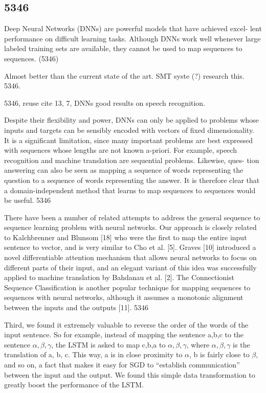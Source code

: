 \subsection{5346}
Deep Neural Networks (DNNs) are powerful models that have achieved excel- lent performance on difficult learning tasks. Although DNNs work well whenever large labeled training sets are available, they cannot be used to map sequences to sequences. (5346)

Almost better than the current state of the art. SMT syste (?) research this. 5346.

5346, reuse cite 13, 7, DNNs good results on speech recognition.

Despite their flexibility and power, DNNs can only be applied to problems whose inputs and targets can be sensibly encoded with vectors of fixed dimensionality. It is a significant limitation, since many important problems are best expressed with sequences whose lengths are not known a-priori. For example, speech recognition and machine translation are sequential problems. Likewise, ques- tion answering can also be seen as mapping a sequence of words representing the question to a sequence of words representing the answer. It is therefore clear that a domain-independent method that learns to map sequences to sequences would be useful. 5346

There have been a number of related attempts to address the general sequence to sequence learning problem with neural networks. Our approach is closely related to Kalchbrenner and Blunsom [18] who were the first to map the entire input sentence to vector, and is very similar to Cho et al. [5]. Graves [10] introduced a novel differentiable attention mechanism that allows neural networks to focus on different parts of their input, and an elegant variant of this idea was successfully applied to machine translation by Bahdanau et al. [2]. The Connectionist Sequence Classification is another popular technique for mapping sequences to sequences with neural networks, although it assumes a monotonic alignment between the inputs and the outputs [11]. 5346

Third, we found it extremely valuable to reverse the order of the words of the input sentence. So for example, instead of mapping the sentence a,b,c to the sentence $\alpha, \beta, \gamma$, the LSTM is asked to map c,b,a to $\alpha, \beta, \gamma$, where $\alpha, \beta, \gamma$ is the translation of a, b, c. This way, a is in close proximity to $\alpha$, b is fairly close to $\beta$, and so on, a fact that makes it easy for SGD to “establish communication” between the input and the output. We found this simple data transformation to greatly boost the performance of the LSTM.

